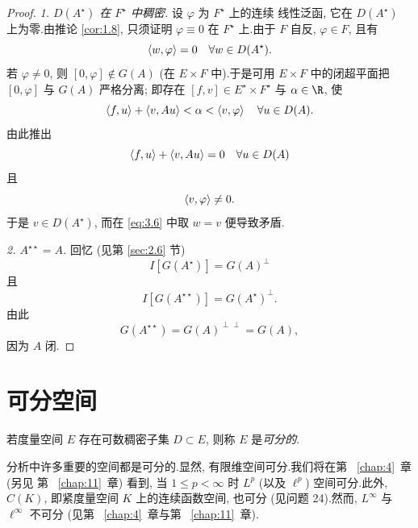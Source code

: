 \begin{proof}
\emph{1. $D(A^\star)$ 在 $F^\star$ 中稠密.} 设 $\varphi$ 为 $F^\star$ 上的连续
线性泛函, 它在 $D(A^\star)$ 上为零.由推论  \ref{cor:1.8}, 只须证明 $\varphi\equiv0$
在 $F^\star$ 上.由于 $F$ 自反, $\varphi\in F$, 且有
\begin{equation}
\left\langle w,\varphi\right\rangle=0\quad\forall w\in D(A^\star).
\label{eq:3.6}
\end{equation}
若 $\varphi\ne0$, 则 $[0,\varphi]\notin G(A)$ (在 $E\times F$ 中).于是可用
$E\times F$ 中的闭超平面把 $[0,\varphi]$ 与 $G(A)$ 严格分离; 即存在
$[f,v]\in E^\star\times F^\star$ 与 $\alpha\in\R$, 使
\begin{equation*}
\left\langle f,u\right\rangle+\left\langle v,Au\right\rangle<\alpha<\left\langle v,\varphi\right\rangle\quad\forall u\in D(A).
\end{equation*}
由此推出
\begin{equation*}
\left\langle f,u\right\rangle+\left\langle v,Au\right\rangle=0\quad\forall u\in D(A)
\end{equation*}
且
\begin{equation*}
\left\langle v,\varphi\right\rangle\ne0.
\end{equation*}
于是 $v\in D(A^\star)$, 而在 \eqref{eq:3.6} 中取 $w=v$ 便导致矛盾.

\emph{2. $A^{\star\star}=A$.} 回忆 (见第  \ref{sec:2.6} 节)
\begin{equation*}
I[G(A^\star)]=G(A)^\perp
\end{equation*}
且
\begin{equation*}
I[G(A^{\star\star})]=G(A^\star)^\perp.
\end{equation*}
由此
\begin{equation*}
G(A^{\star\star})=G(A)^{\perp\perp}=G(A),
\end{equation*}
因为 $A$ 闭.
\end{proof}

\section{可分空间}
\label{sec:3.6}

\begin{definition}
若度量空间 $E$ 存在可数稠密子集 $D\subset E$, 则称 $E$ 是\emph{可分的}.
\end{definition}

分析中许多重要的空间都是可分的.显然, 有限维空间可分.我们将在第~
\ref{chap:4}~章 (另见
第~
\ref{chap:11}~章) 看到, 当 $1\le p<\infty$ 时 $L^p$ (以及 $\ell^p$) 空间可分.此外,
$C(K)$, 即紧度量空间 $K$ 上的连续函数空间, 也可分 (见问题 24).然而,
$L^\infty$ 与 $\ell^\infty$ 不可分 (见第~
\ref{chap:4}~章与第~
\ref{chap:11}~章).

